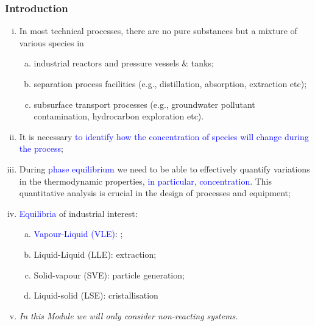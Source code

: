 \documentclass[10pt,compress,unknownkeysallowed]{beamer}
\begin{document}
\begin{frame}
  \frametitle{Introduction}
  \begin{enumerate}[i)]
    \item<1-> In most technical processes, there are no pure substances but a mixture of various species in
        \begin{enumerate}[a)]
          \item<1-> industrial reactors and pressure vessels $\&$ tanks;
          \item<1-> separation process facilities (e.g., distillation, absorption, extraction etc);
          \item<1-> subsurface transport processes (e.g., groundwater pollutant contamination, hydrocarbon exploration etc).     
        \end{enumerate}
    \item<2-> It is necessary \textcolor{blue}{to identify how the concentration of species will change during the process};
    \item<3-> During \textcolor{blue}{phase equilibrium} we need to be able to effectively quantify variations in the thermodynamic properties, \textcolor{blue}{in particular, concentration}. This quantitative analysis is crucial in the design of processes and equipment;
    \item<4-> \textcolor{blue}{Equilibria} of industrial interest:
        \begin{enumerate}[a)]
          \item<5-> \textcolor{blue}{Vapour-Liquid (VLE)}: ;
          \item<5-> Liquid-Liquid (LLE): extraction;
          \item<5-> Solid-vapour (SVE): particle generation;
          \item<5-> Liquid-solid (LSE): cristallisation
        \end{enumerate}
    \item<5-> {\it In this Module we will only consider non-reacting systems.}
  \end{enumerate}
\end{frame}
\normalsize
\end{document}

